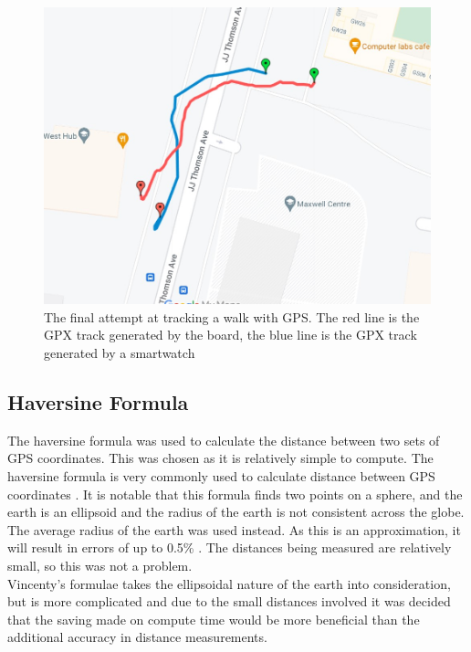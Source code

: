 \documentclass[12pt,a4paper]{report}
\begin{document}
\begin{figure} [h]
\begin{center}
\includegraphics[scale=0.4]{gps2.jpg}
\end{center}
\caption{The final attempt at tracking a walk with GPS. The red line is the GPX track generated by the board, the blue line is the GPX track generated by a smartwatch \cite{googlemapsgeneral}}
\end{figure}
\FloatBarrier

\subsection{Haversine Formula}
The haversine formula was used to calculate the distance between two sets of GPS coordinates. This was chosen as it is relatively simple to compute. The haversine formula is very commonly used to calculate distance between GPS coordinates \cite{haversine}. It is notable that this formula finds two points on a sphere, and the earth is an ellipsoid and the radius of the earth is not consistent across the globe. The average radius of the earth was used instead. As this is an approximation, it will result in errors of up to 0.5\% \cite{haversine}. The distances being measured are relatively small, so this was not a problem. \\
Vincenty's formulae takes the ellipsoidal nature of the earth into consideration, but is more complicated and due to the small distances involved it was decided that the saving made on compute time would be more beneficial than the additional accuracy in distance measurements. \\
\end{document}
